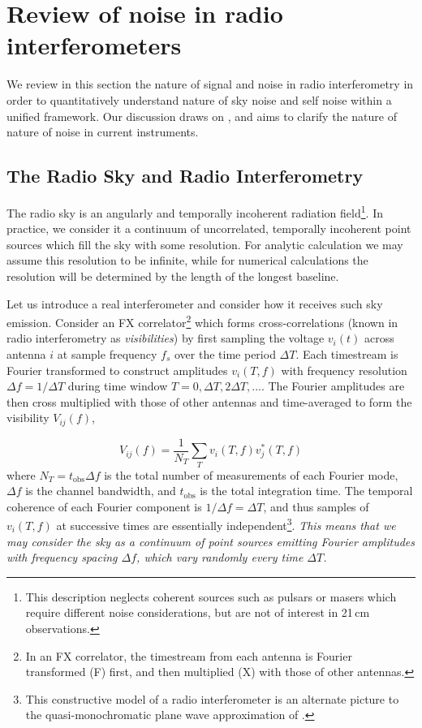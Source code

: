 \appendix 

\chapter{Review of noise in radio interferometers}

We review in this section the nature of signal and noise in radio interferometry in order to quantitatively understand nature of sky noise and self noise within a unified framework. Our discussion draws on \citet{thompsonmoranswenson, dewey94, kulkarni89,ellingson2011,synthesisimaging}, and aims to clarify the nature of nature of noise in current instruments.

\section{The Radio Sky and Radio Interferometry}
\label{sec:theradiosky}

The radio sky is an angularly and temporally incoherent radiation field\footnote{This description neglects coherent sources such as pulsars or masers which require different noise considerations, but are not of interest in 21\,cm observations.}. In practice, we consider it a continuum of uncorrelated, temporally incoherent point sources which fill the sky with some resolution. For analytic calculation we may assume this resolution to be infinite, while for numerical calculations the resolution will be determined by the length of the longest baseline. 

Let us introduce a real interferometer and consider how it receives such sky emission. Consider an FX correlator\footnote{In an FX correlator, the timestream from each antenna is Fourier transformed (F) first, and then multiplied (X) with those of other antennas.} which forms cross-correlations (known in radio interferometry as \textit{visibilities}) by first sampling the voltage $v_i(t)$ across antenna $i$ at sample frequency $f_s$ over the time period $\Delta T$. Each timestream is Fourier transformed to construct amplitudes $v_i(T,f)$ with frequency resolution $\Delta f=1/\Delta T$ during time window $T=0,\Delta T, 2\Delta T, ...$. The Fourier amplitudes are then cross multiplied with those of other antennas and time-averaged to form the visibility $V_{ij}(f)$,

\begin{equation}
\label{eqn:visdef}
V_{ij}(f)=\frac{1}{N_T}\sum_{T}v_i(T,f)v_j^*(T,f)
\end{equation}
where $N_T=t_\text{obs}\Delta f$ is the total number of measurements of each Fourier mode, $\Delta f$ is the channel bandwidth, and $t_\text{obs}$ is the total integration time.
The temporal coherence of each Fourier component is $1/\Delta f=\Delta T$, and thus samples of $v_i(T,f)$ at successive times are essentially independent\footnote{This constructive model of a radio interferometer is an alternate picture to the quasi-monochromatic plane wave approximation of \citet{synthesisimaging}.}. \textit{This means that we may consider the sky as a continuum of point sources emitting Fourier amplitudes with frequency spacing $\Delta f$, which vary randomly every time $\Delta T$.} 

